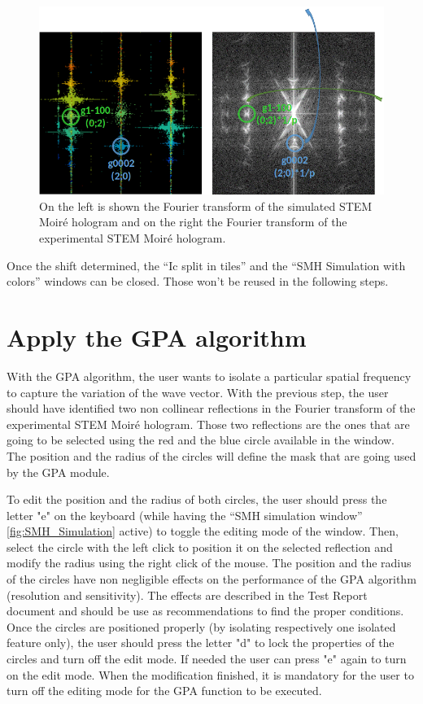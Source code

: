\documentclass[12pt, titlepage]{article}
\begin{document}
\begin{figure}[H]
\centering
\includegraphics[scale=0.6]{Figures/Read_simulation_2.png}
\caption{On the left is shown the Fourier transform of the simulated STEM Moir{\'e} hologram and on the right the Fourier transform of the experimental STEM Moir{\'e} hologram.}
\label{fig:shift_extraction_2}
\end{figure}

Once the shift determined, the \enquote{Ic split in tiles} and the \enquote{SMH Simulation with colors} windows can be closed. Those won't be reused in the following steps.

\section{Apply the GPA algorithm}

With the GPA algorithm, the user wants to isolate a particular spatial frequency to capture the variation of the wave vector. With the previous step, the user should have identified two non collinear reflections in the Fourier transform of the experimental STEM Moir{\'e} hologram. Those two reflections are the ones that are going to be selected using the red and the blue circle available in the window. The position and the radius of the circles will define the mask that are going used by the GPA module.\medskip

To edit the position and the radius of both circles, the user should press the letter "e" on the keyboard (while having the \enquote{SMH simulation window} \cref{fig:SMH_Simulation} active) to toggle the editing mode of the window. Then, select the circle with the left click to position it on the selected reflection and modify the radius using the right click of the mouse. The position and the radius of the circles have non negligible effects on the performance of the GPA algorithm (resolution and sensitivity). The effects are described in the Test Report document and should be use as recommendations to find the proper conditions. Once the circles are positioned properly (by isolating respectively one isolated feature only), the user should press the letter "d" to lock the properties of the circles and turn off the edit mode. If needed the user can press "e" again to turn on the edit mode. When the modification finished, it is mandatory for the user to turn off the editing mode for the GPA function to be executed.\medskip
\end{document}
